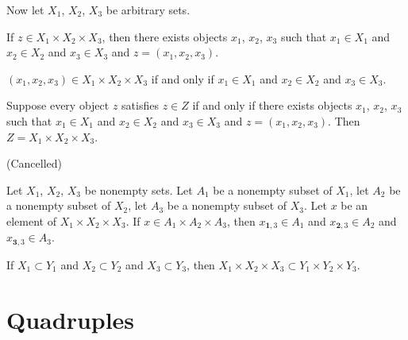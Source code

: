 \documentclass{article}
\begin{document}
Now let $X_{1}$, $X_{2}$, $X_{3}$ be arbitrary sets.
\begin{thm}
\item\label{mcart1:68} If $z\in X_{1}\times X_{2}\times X_{3}$,
  then there exists objects $x_{1}$, $x_{2}$, $x_{3}$ such that
  $x_{1}\in X_{1}$ and $x_{2}\in X_{2}$ and $x_{3}\in X_{3}$ and
  $z=(x_{1},x_{2},x_{3})$. 
\item\label{mcart1:69} $(x_{1},x_{2},x_{3})\in X_{1}\times X_{2}\times X_{3}$
  if and only if $x_{1}\in X_{1}$ and $x_{2}\in X_{2}$ and $x_{3}\in X_{3}$.
\item\label{mcart1:70} Suppose every object $z$ satisfies $z\in Z$
  if and only if there exists objects $x_{1}$, $x_{2}$, $x_{3}$ such that
  $x_{1}\in X_{1}$ and $x_{2}\in X_{2}$ and $x_{3}\in X_{3}$ and
  $z=(x_{1},x_{2},x_{3})$. Then $Z=X_{1}\times X_{2}\times X_{3}$.
\item\label{mcart1:71} (Cancelled)
\item\label{mcart1:72} Let $X_{1}$, $X_{2}$, $X_{3}$ be nonempty sets.
  Let $A_{1}$ be a nonempty subset of $X_{1}$,
  let $A_{2}$ be a nonempty subset of $X_{2}$,
  let $A_{3}$ be a nonempty subset of $X_{3}$.
  Let $x$ be an element of $X_{1}\times X_{2}\times X_{3}$.
  If $x\in A_{1}\times A_{2}\times A_{3}$,
  then $x_{\mathbf{1},3}\in A_{1}$ and
  $x_{\mathbf{2},3}\in A_{2}$ and
  $x_{\mathbf{3},3}\in A_{3}$.
\item\label{mcart1:73} If $X_{1}\subset Y_{1}$ and
  $X_{2}\subset Y_{2}$ and
  $X_{3}\subset Y_{3}$,
  then $X_{1}\times X_{2}\times X_{3}\subset Y_{1}\times Y_{2}\times Y_{3}$.
\end{thm}

\section{Quadruples}
\end{document}
